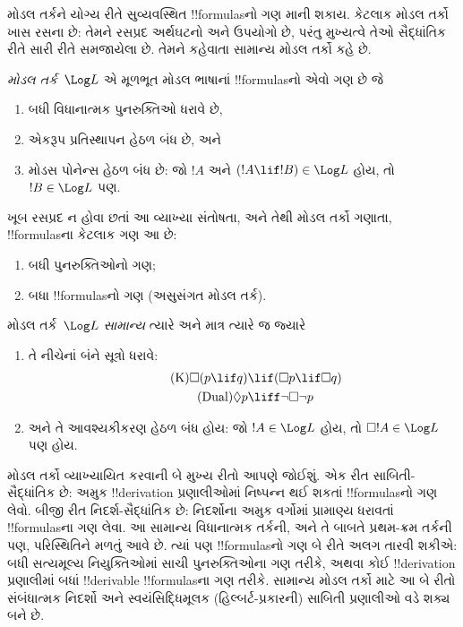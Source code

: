 \documentclass[../../../include/open-logic-section]{subfiles}
\begin{document}


મોડલ તર્કને યોગ્ય રીતે સુવ્યવસ્થિત
!!{formula}sનો ગણ માની શકાય.
કેટલાક મોડલ તર્કો ખાસ રસના
છે: તેમને રસપ્રદ અર્થઘટનો અને
ઉપયોગો છે, પરંતુ મુખ્યત્વે તેઓ
સૈદ્ધાંતિક રીતે સારી રીતે
સમજાયેલા છે. તેમને કહેવાતા
સામાન્ય મોડલ તર્કો કહે છે.

\begin{defn}
\emph{મોડલ તર્ક}~$\Log L$
એ મૂળભૂત મોડલ ભાષાનાં
!!{formula}sનો એવો ગણ છે જે
\begin{enumerate}
\item બધી વિધાનાત્મક પુનરુક્તિઓ
  ધરાવે છે,
\item એકરૂપ પ્રતિસ્થાપન હેઠળ
  બંધ છે, અને
\item મોડસ પોનેન્સ હેઠળ બંધ છે:
  જો $!A$ અને $(!A \lif
  !B) \in \Log L$ હોય,
  તો $!B \in \Log L$ પણ.
\end{enumerate}
\end{defn}

\begin{ex}
ખૂબ રસપ્રદ ન હોવા છતાં
આ વ્યાખ્યા સંતોષતા,
અને તેથી મોડલ તર્કો
ગણાતા, !!{formula}sના
કેટલાક ગણ આ છે:
\begin{enumerate}
\item બધી પુનરુક્તિઓનો ગણ;
\item બધા !!{formula}sનો ગણ
  (અસુસંગત મોડલ તર્ક).
\end{enumerate}
\end{ex}

\begin{defn}\label{defn:normal-modal-logic}
મોડલ તર્ક~$\Log L$
\emph{સામાન્ય} ત્યારે અને
માત્ર ત્યારે જ જ્યારે
\begin{enumerate}
\item તે નીચેનાં બંને
  સૂત્રો ધરાવે:
\begin{align}
\tag{K} \Box(p \lif q) & \lif (\Box p \lif \Box q) \\
\tag{Dual} \Diamond p & \liff \lnot \Box \lnot p
\end{align}
\item અને તે આવશ્યકીકરણ
  હેઠળ બંધ હોય: જો
  $!A \in
  \Log L$ હોય,
  તો $\Box !A \in \Log L$
  પણ હોય.
\end{enumerate}
\end{defn}

મોડલ તર્કો વ્યાખ્યાયિત કરવાની
બે મુખ્ય રીતો આપણે જોઈશું.
એક રીત સાબિતી-સૈદ્ધાંતિક
છે: અમુક !!{derivation}
પ્રણાલીઓમાં નિષ્પન્ન થઈ
શકતાં !!{formula}sનો ગણ
લેવો. બીજી રીત
નિદર્શ-સૈદ્ધાંતિક છે:
નિદર્શોના અમુક વર્ગોમાં
પ્રામાણ્ય ધરાવતાં
!!{formula}sના ગણ લેવા.
આ સામાન્ય વિધાનાત્મક
તર્કની, અને તે બાબતે
પ્રથમ-ક્રમ તર્કની પણ,
પરિસ્થિતિને મળતું આવે
છે. ત્યાં પણ
!!{formula}sનો ગણ
બે રીતે અલગ તારવી
શકીએ: બધી સત્યમૂલ્ય
નિયુક્તિઓમાં સાચી
પુનરુક્તિઓના ગણ તરીકે,
અથવા કોઈ !!{derivation}
પ્રણાલીમાં બધાં
!!{derivable}
!!{formula}sના ગણ
તરીકે. સામાન્ય
મોડલ તર્કો માટે
આ બે રીતો
સંબંધાત્મક નિદર્શો
અને સ્વયંસિદ્ધિમૂલક
(હિલ્બર્ટ-પ્રકારની)
સાબિતી પ્રણાલીઓ
વડે શક્ય બને છે.
\end{document}
